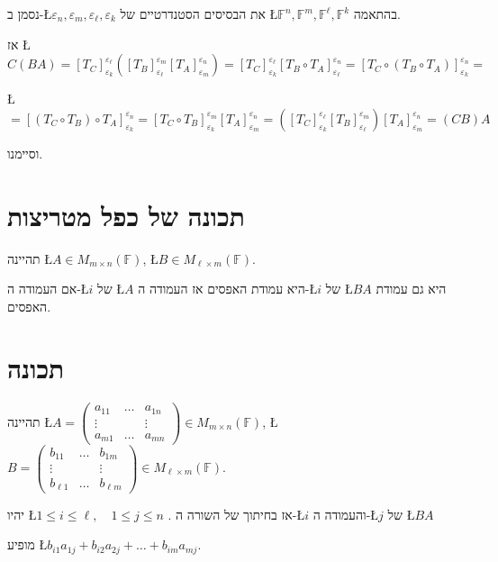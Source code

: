 \documentclass[english,hebrew]{article}
\begin{document}
נסמן ב-\L{$\varepsilon_{n},\varepsilon_{m},\varepsilon_{\ell},\varepsilon_{k}$}
את הבסיסים הסטנדרטיים של \L{$\mathbb{F}^{n},\mathbb{F}^{m},\mathbb{F}^{\ell},\mathbb{F}^{k}$}
בהתאמה.

אז \L{$C(BA)=[T_{C}]_{\varepsilon_{k}}^{\varepsilon_{\ell}}([T_{B}]_{\varepsilon_{\ell}}^{\varepsilon_{m}}[T_{A}]_{\varepsilon_{m}}^{\varepsilon_{n}})=[T_{C}]_{\varepsilon_{k}}^{\varepsilon_{\ell}}[T_{B}\circ T_{A}]_{\varepsilon_{\ell}}^{\varepsilon_{n}}=[T_{C}\circ(T_{B}\circ T_{A})]_{\varepsilon_{k}}^{\varepsilon_{n}}=$}

\L{$=[(T_{C}\circ T_{B})\circ T_{A}]_{\varepsilon_{k}}^{\varepsilon_{n}}=[T_{C}\circ T_{B}]_{\varepsilon_{k}}^{\varepsilon_{m}}[T_{A}]_{\varepsilon_{m}}^{\varepsilon_{n}}=([T_{C}]_{\varepsilon_{k}}^{\varepsilon_{\ell}}[T_{B}]_{\varepsilon_{\ell}}^{\varepsilon_{m}})[T_{A}]_{\varepsilon_{m}}^{\varepsilon_{n}}=(CB)A$}

וסיימנו.

\section{תכונה של כפל מטריצות}

תהיינה \L{$A\in M_{m\times n}(\mathbb{F})$}, \L{$B\in M_{\ell\times m}(\mathbb{F})$}.

אם העמודה ה-\L{$i$} של \L{$A$} היא עמודת האפסים אז העמודה ה-\L{$i$}
של \L{$BA$} היא גם עמודת האפסים. 

\section{תכונה }

תהיינה \L{$A=\left(\begin{array}{ccc}
a_{11} & \dots & a_{1n}\\
\vdots &  & \vdots\\
a_{m1} & \dots & a_{mn}
\end{array}\right)\in M_{m\times n}(\mathbb{F})$}, \L{$B=\left(\begin{array}{ccc}
b_{11} & \dots & b_{1m}\\
\vdots &  & \vdots\\
b_{\ell1} & \dots & b_{\ell m}
\end{array}\right)\in M_{\ell\times m}(\mathbb{F})$}.

יהיו \L{$1\leq i\leq\ell,\quad1\leq j\leq n$} . אז בחיתוך של השורה
ה-\L{$i$} והעמודה ה-\L{$j$} של \L{$BA$} 

מופיע \L{$b_{i1}a_{1j}+b_{i2}a_{2j}+\dots+b_{im}a_{mj}$}.
\end{document}
